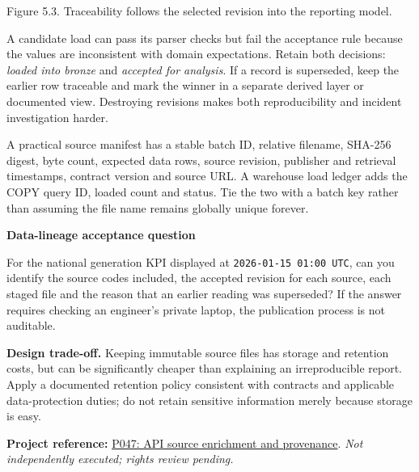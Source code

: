 \documentclass[11pt,twoside]{article}
\newcommand{\repo}[2]{\par\begingroup\fontsize{8.0}{9.6}\selectfont\sffamily\color{inkgray}\textbf{Project reference:} \href{#2}{#1}. \textit{Not independently executed; rights review pending.}\par\endgroup}
\begin{document}
\begin{center}\par{\fontsize{8}{10}\selectfont\color{inkgray}Figure 5.3. Traceability follows the selected revision into the reporting model.}\end{center}
A candidate load can pass its parser checks but fail the acceptance rule because the values are inconsistent with domain expectations. Retain both decisions: \emph{loaded into bronze} and \emph{accepted for analysis}. If a record is superseded, keep the earlier row traceable and mark the winner in a separate derived layer or documented view. Destroying revisions makes both reproducibility and incident investigation harder.

A practical source manifest has a stable batch ID, relative filename, SHA-256 digest, byte count, expected data rows, source revision, publisher and retrieval timestamps, contract version and source URL. A warehouse load ledger adds the COPY query ID, loaded count and status. Tie the two with a batch key rather than assuming the file name remains globally unique forever.

\begin{whitebox}\textbf{Data-lineage acceptance question}\par
For the national generation KPI displayed at \texttt{2026-01-15 01:00 UTC}, can you identify the source codes included, the accepted revision for each source, each staged file and the reason that an earlier reading was superseded? If the answer requires checking an engineer's private laptop, the publication process is not auditable.\end{whitebox}
\textbf{Design trade-off.} Keeping immutable source files has storage and retention costs, but can be significantly cheaper than explaining an irreproducible report. Apply a documented retention policy consistent with contracts and applicable data-protection duties; do not retain sensitive information merely because storage is easy.
\repo{P047: API source enrichment and provenance}{https://github.com/Snowflake-Labs/sfguide-getting-started-with-api-enrichment-framework}
\newpage
\end{document}
